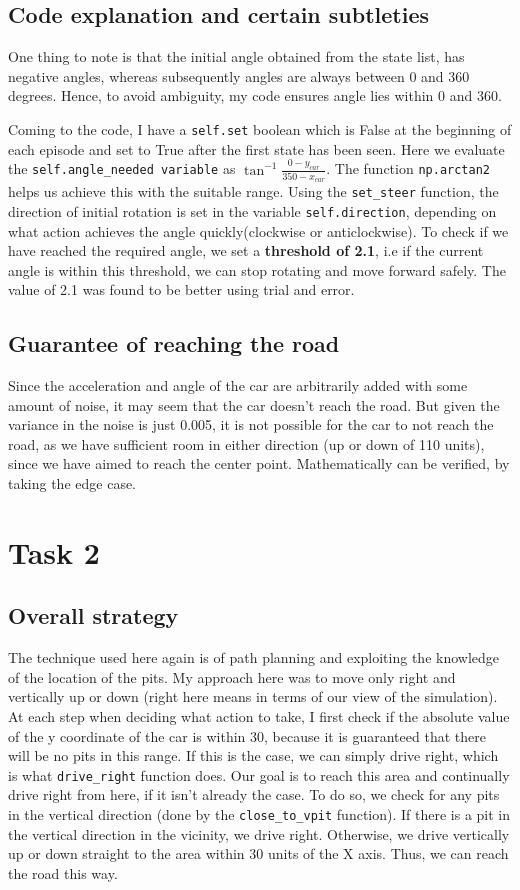\documentclass{article}
\begin{document}
\subsection{Code explanation and certain subtleties}{
One thing to note is that the initial angle obtained from the state list, has negative angles, whereas subsequently angles are always between 0 and 360 degrees.
Hence, to avoid ambiguity, my code ensures angle lies within 0 and 360. 

Coming to the code, I have a \verb!self.set! boolean which is False at the beginning of each episode and set to True after the first state has been seen. Here we evaluate the \verb!self.angle_needed variable! as $\tan^{-1} \frac{0-y_{car}}{350 - x_{car}}$. The function \verb!np.arctan2! 
helps us achieve this with the suitable range.
Using the \verb!set_steer! function, the direction of initial rotation is set in the variable \verb!self.direction!, depending on what action achieves the angle quickly(clockwise or anticlockwise).
To check if we have reached the required angle, we set a \textbf{threshold of 2.1}, i.e if the current angle is within this threshold, we can stop rotating and move forward safely. The value of 2.1
was found to be better using trial and error.

\subsection{Guarantee of reaching the road}
Since the acceleration and angle of the car are arbitrarily added with some amount of noise, it may seem that the car doesn't reach the road.
But given the variance in the noise is just 0.005, it is not possible for the car to not reach the road, as we have sufficient room 
in either direction (up or down of 110 units), since we have aimed to reach the center point. Mathematically can be verified, by taking the edge case.


\newpage
\thispagestyle{fancy}
\section{Task 2}
\subsection{Overall strategy}
The technique used here again is of path planning and exploiting the knowledge of the location of the pits. My approach here was to move only right
and vertically up or down (right here means in terms of our view of the simulation). At each step when deciding what action to take,
I first check if the absolute value of the y coordinate of the car is within 30, because it is guaranteed that there will be no pits in this range.
If this is the case, we can simply drive right, which is what \verb!drive_right! function does. Our goal is to reach this area and continually drive right from here, if it isn't already the case.
To do so, we check for any pits in the vertical direction (done by the \verb!close_to_vpit! function). If there is a pit in the vertical direction in the vicinity,
we drive right. Otherwise, we drive vertically up or down straight to the area within 30 units of the X axis. Thus, we can reach the road this way.

}
\end{document}
